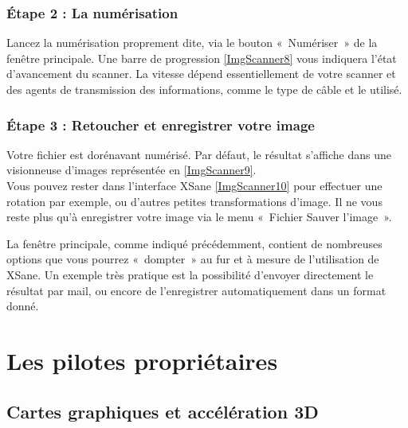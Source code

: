 \subsubsection{Étape 2 : La numérisation}
Lancez la numérisation proprement dite, via le bouton «~Numériser~» de la fenêtre principale. Une barre de progression \ref{ImgScanner8} vous indiquera l'état d'avancement du scanner. La vitesse dépend essentiellement de votre scanner et des agents de transmission des informations, comme le type de câble et le  utilisé.\par
{}
\subsubsection{Étape 3 : Retoucher et enregistrer votre image}
Votre fichier est dorénavant numérisé. Par défaut, le résultat s'affiche dans une visionneuse d'images représentée en \ref{ImgScanner9}.\\
Vous pouvez rester dans l'interface XSane \ref{ImgScanner10} pour effectuer une rotation par exemple, ou d'autres petites transformations d'image. Il ne vous reste plus qu'à enregistrer votre image via le menu «~Fichier \FlecheDroite Sauver l'image~».\par
\ScannerEtapeDeux
\begin{nota}
La fenêtre principale, comme indiqué précédemment, contient de nombreuses options que vous pourrez «~dompter~» au fur et à mesure de l'utilisation de XSane. Un exemple très pratique est la possibilité d'envoyer directement le résultat par mail, ou encore de l'enregistrer automatiquement dans un format donné.
\end{nota}
\section{Les pilotes propriétaires}
\label{RefInstallProprio}
\subsection{Cartes graphiques et accélération 3D}
